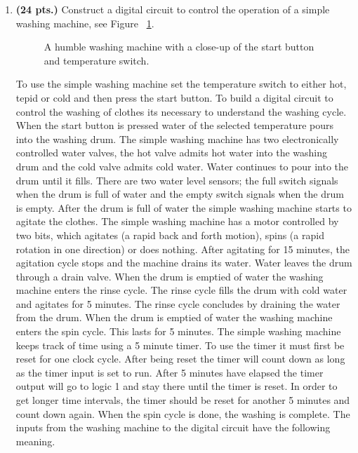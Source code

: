 \begin{enumerate}
\item {\bf (24 pts.)}
Construct a digital circuit to control the operation of a
simple washing machine, see Figure ~\ref{fig:Wash}.
\begin{figure}[ht]
\caption{A humble washing machine with a close-up of the start
button and temperature switch.}
\label{fig:Wash}
\end{figure}
To use the simple washing machine set the temperature switch to 
either hot, tepid or cold and then press the start button.
To build a digital circuit to control the washing of clothes
its necessary to understand the washing cycle.  When the start
button is pressed water of the selected temperature pours 
into the washing drum.  The simple washing machine has two 
electronically controlled water valves, the hot valve admits 
hot water into the washing drum and the cold valve admits 
cold water.  Water continues to pour into the drum until it
fills.  There are two water level sensors; the full switch signals when 
the drum is full of water and the empty switch signals when the drum
is empty.  After the drum is full of water the simple washing machine
starts to agitate the clothes.  The simple washing machine has a motor 
controlled by two bits, which agitates (a rapid back and forth motion), 
spins (a rapid rotation in one direction) or does nothing.  After 
agitating for 15 minutes, the agitation cycle stops and
the machine drains its water.  Water leaves the drum through
a drain valve.  When the drum is emptied of water the washing machine enters
the rinse cycle.   The rinse cycle fills the drum with cold
water and agitates for 5 minutes.  The rinse cycle concludes
by draining the water from the drum.
When the drum is emptied of water the washing machine enters
the spin cycle.  This lasts for 5 minutes.  The simple washing machine 
keeps track of time  using a 5 minute timer.   To use the timer 
it must first be reset for one clock cycle.  After being reset the 
timer will count down as long as the timer input is set to run.  
After 5 minutes have elapsed the timer output will go to logic 1 and 
stay there until the timer is reset.  In order to get longer time
intervals, the timer should be reset for another 5 minutes and count 
down again.  When the spin cycle is done, the washing is complete. The 
inputs from the washing machine to the digital circuit have the 
following meaning.


\end{enumerate}
